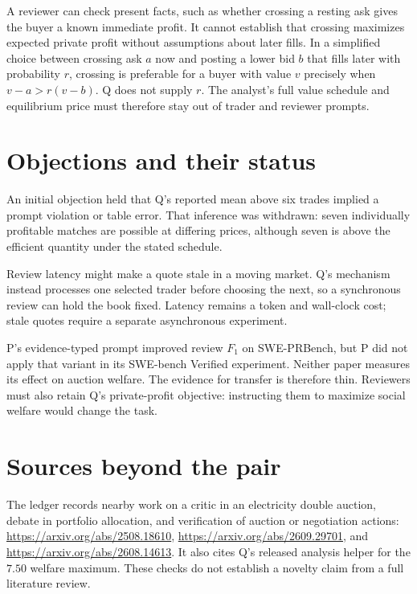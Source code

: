 \documentclass{article}
\begin{document}
A reviewer can check present facts, such as whether crossing a resting ask gives the buyer a known immediate profit. It cannot establish that crossing maximizes expected private profit without assumptions about later fills. In a simplified choice between crossing ask \(a\) now and posting a lower bid \(b\) that fills later with probability \(r\), crossing is preferable for a buyer with value \(v\) precisely when \(v-a>r(v-b)\). Q does not supply \(r\). The analyst's full value schedule and equilibrium price must therefore stay out of trader and reviewer prompts. 

\section*{Objections and their status}

An initial objection held that Q's reported mean above six trades implied a prompt violation or table error. That inference was withdrawn: seven individually profitable matches are possible at differing prices, although seven is above the efficient quantity under the stated schedule. 

Review latency might make a quote stale in a moving market. Q's mechanism instead processes one selected trader before choosing the next, so a synchronous review can hold the book fixed. Latency remains a token and wall-clock cost; stale quotes require a separate asynchronous experiment. 

P's evidence-typed prompt improved review \(F_1\) on SWE-PRBench, but P did not apply that variant in its SWE-bench Verified experiment. Neither paper measures its effect on auction welfare. The evidence for transfer is therefore thin. Reviewers must also retain Q's private-profit objective: instructing them to maximize social welfare would change the task. 

\section*{Sources beyond the pair}

The ledger records nearby work on a critic in an electricity double auction, debate in portfolio allocation, and verification of auction or negotiation actions: \url{https://arxiv.org/abs/2508.18610}, \url{https://arxiv.org/abs/2609.29701}, and \url{https://arxiv.org/abs/2608.14613}. It also cites Q's released analysis helper for the \(7.50\) welfare maximum. These checks do not establish a novelty claim from a full literature review. 
\end{document}
